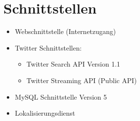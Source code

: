 \section{Schnittstellen}
   \begin{itemize}
   \item Webschnittstelle (Internetzugang) 
	\item Twitter Schnittstellen:
	\begin{itemize}
	\item Twitter Search API Version 1.1
	\item Twitter Streaming API (Public API)
	\end{itemize}
\item MySQL Schnittstelle Version 5
\item Lokalisierungsdienst
   \end{itemize}